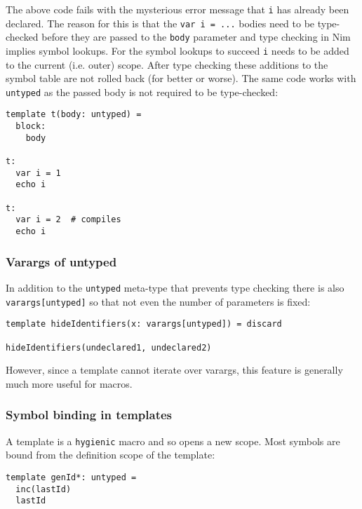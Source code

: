 The above code fails with the mysterious error message that \texttt{i}
has already been declared. The reason for this is that the
\texttt{var\ i\ =\ ...} bodies need to be type-checked before they are
passed to the \texttt{body} parameter and type checking in Nim implies
symbol lookups. For the symbol lookups to succeed \texttt{i} needs to be
added to the current (i.e. outer) scope. After type checking these
additions to the symbol table are not rolled back (for better or worse).
The same code works with \texttt{untyped} as the passed body is not
required to be type-checked:

\begin{verbatim}
template t(body: untyped) =
  block:
    body

t:
  var i = 1
  echo i

t:
  var i = 2  # compiles
  echo i
\end{verbatim}

\hypertarget{varargs-of-untyped}{%
\subsubsection{Varargs of untyped}\label{varargs-of-untyped}}

In addition to the \texttt{untyped} meta-type that prevents type
checking there is also \texttt{varargs{[}untyped{]}} so that not even
the number of parameters is fixed:

\begin{verbatim}
template hideIdentifiers(x: varargs[untyped]) = discard

hideIdentifiers(undeclared1, undeclared2)
\end{verbatim}

However, since a template cannot iterate over varargs, this feature is
generally much more useful for macros.

\hypertarget{symbol-binding-in-templates}{%
\subsubsection{Symbol binding in
templates}\label{symbol-binding-in-templates}}

A template is a \texttt{hygienic} macro and so opens a new scope. Most
symbols are bound from the definition scope of the template:

\begin{verbatim}
template genId*: untyped =
  inc(lastId)
  lastId
\end{verbatim}


